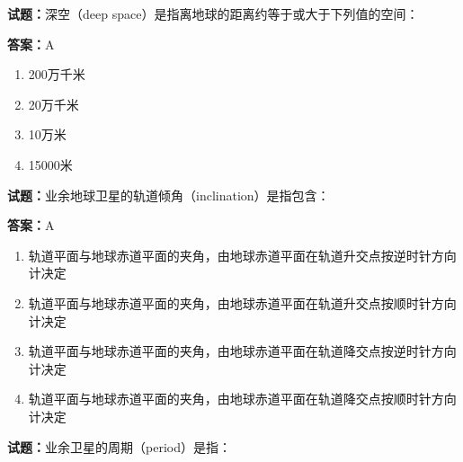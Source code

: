 \documentclass{ctexbook}
\begin{document}




\vspace{1em}

\textbf{试题：}深空（deep space）是指离地球的距离约等于或大于下列值的空间： 

\textbf{答案：}A 

\begin{enumerate}[leftmargin=3em]
  \item 200万千米 

  \item 20万千米 


  \item 10万米 

  \item 15000米 

\end{enumerate}





\vspace{1em}

\textbf{试题：}业余地球卫星的轨道倾角（inclination）是指包含： 

\textbf{答案：}A 

\begin{enumerate}[leftmargin=3em]
  \item 轨道平面与地球赤道平面的夹角，由地球赤道平面在轨道升交点按逆时针方向计决定 

  \item 轨道平面与地球赤道平面的夹角，由地球赤道平面在轨道升交点按顺时针方向计决定 

  \item 轨道平面与地球赤道平面的夹角，由地球赤道平面在轨道降交点按逆时针方向计决定 

  \item 轨道平面与地球赤道平面的夹角，由地球赤道平面在轨道降交点按顺时针方向计决定 

\end{enumerate}





\vspace{1em}

\textbf{试题：}业余卫星的周期（period）是指： 
\end{document}
